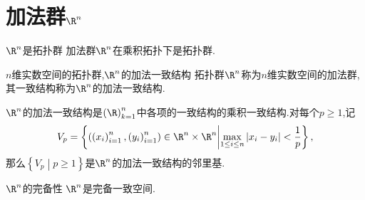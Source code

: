 \section{加法群\texorpdfstring{$\R^{n}$}{Rn}}

\begin{proposition}{$\R^{n}$是拓扑群}{}
	加法群$\R^{n}$在乘积拓扑下是拓扑群.
\end{proposition}

\begin{definition}{$n$维实数空间的拓扑群,$\R^{n}$的加法一致结构}{}
	拓扑群$\R^{n}$称为$n$维实数空间的加法群,其一致结构称为$\R^{n}$的加法一致结构.
\end{definition}

\begin{remark}{}{}
	$\R^{n}$的加法一致结构是$\left(\R\right)_{k=1}^{n}$中各项的一致结构的乘积一致结构.对每个$p\geq 1$,记
	\begin{align*}
		V_{p}=\left\{\left(\left(x_{i}\right)_{i=1}^{n},\left(y_{i}\right)_{i=1}^{n}\right)\in\R^{n}\times\R^{n}\middle|\max\limits_{1\leq i\leq n}\left|x_{i}-y_{i}\right|<\frac{1}{p}\right\},
	\end{align*}
	那么$\left\{V_{p}\middle|p\geq 1\right\}$是$\R^{n}$的加法一致结构的邻里基.
\end{remark}

\begin{proposition}{$\R^{n}$的完备性}{}
	$\R^{n}$是完备一致空间.
\end{proposition}
